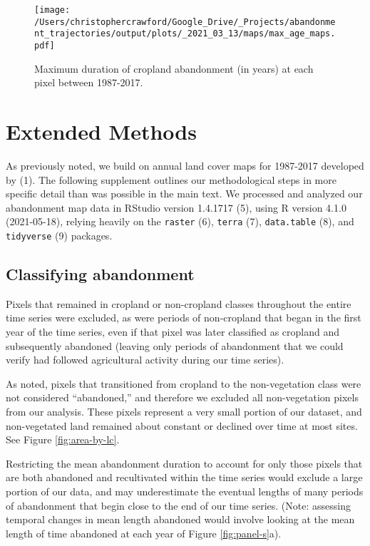 \documentclass[9pt,twoside,lineno]{pnas-new}
\begin{document}
\begin{figure}
\centering
\texttt{[image: /Users/christophercrawford/Google\_Drive/\_Projects/abandonment\_trajectories/output/plots/\_2021\_03\_13/maps/max\_age\_maps.pdf]}
\caption{\label{fig:map-abn-age-max}Maximum duration of cropland abandonment (in years) at each pixel between 1987-2017.}
\end{figure}

\newpage

\hypertarget{methods-si}{%
\section{Extended Methods}\label{methods-si}}

As previously noted, we build on annual land cover maps for 1987-2017 developed by (1).
The following supplement outlines our methodological steps in more specific detail than was possible in the main text.
We processed and analyzed our abandonment map data in RStudio version 1.4.1717 (5), using R version 4.1.0 (2021-05-18), relying heavily on the \texttt{raster} (6), \texttt{terra} (7), \texttt{data.table} (8), and \texttt{tidyverse} (9) packages.

\hypertarget{classifying-abandonment}{%
\subsection{Classifying abandonment}\label{classifying-abandonment}}

Pixels that remained in cropland or non-cropland classes throughout the entire time series were excluded, as were periods of non-cropland that began in the first year of the time series, even if that pixel was later classified as cropland and subsequently abandoned (leaving only periods of abandonment that we could verify had followed agricultural activity during our time series).

As noted, pixels that transitioned from cropland to the non-vegetation class were not considered ``abandoned,'' and therefore we excluded all non-vegetation pixels from our analysis.
These pixels represent a very small portion of our dataset, and non-vegetated land remained about constant or declined over time at most sites.
See Figure \ref{fig:area-by-lc}.

Restricting the mean abandonment duration to account for only those pixels that are both abandoned and recultivated within the time series would exclude a large portion of our data, and may underestimate the eventual lengths of many periods of abandonment that begin close to the end of our time series.
(Note: assessing temporal changes in mean length abandoned would involve looking at the mean length of time abandoned at each year of Figure \ref{fig:panel-s}a).
\end{document}
